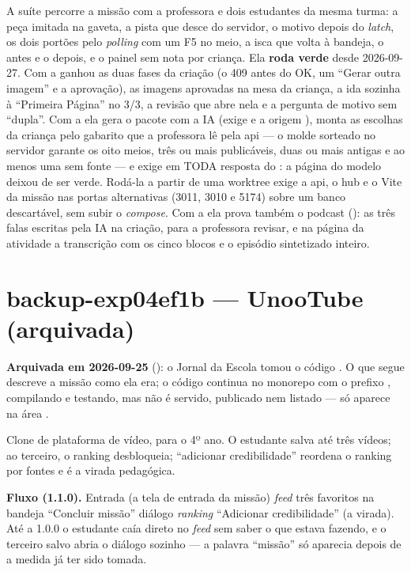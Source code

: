 A suíte  percorre a missão
com a professora e dois estudantes da mesma turma: a peça imitada na gaveta, a
pista que desce do servidor, o motivo depois do \emph{latch}, os dois portões
pelo \emph{polling} com um F5 no meio, a isca que volta à bandeja, o antes e o
depois, e o painel sem nota por criança. Ela \textbf{roda verde} desde
2026-09-27. Com a  ganhou as duas fases da criação (o 409
 antes do OK, um \enquote{Gerar outra imagem} e a
aprovação), as imagens aprovadas na mesa da criança, a ida sozinha à
\enquote{Primeira Página} no 3/3, a revisão que abre nela e a pergunta de
motivo sem \enquote{dupla}. Com a  ela gera o pacote com a IA
(exige  e a origem ), monta as escolhas da criança pelo
gabarito que a professora lê pela api --- o molde sorteado no servidor garante
os oito meios, três ou mais publicáveis, duas ou mais antigas e ao menos uma sem
fonte --- e exige  em TODA resposta do : a página do modelo deixou de ser verde. Rodá-la a partir de uma worktree exige a api, o hub e o Vite da
missão nas portas alternativas (3011, 3010 e 5174) sobre um banco descartável,
sem subir o \emph{compose}. Com a  ela prova também o podcast
(): as três falas escritas pela IA na
criação, para a professora revisar, e na página da atividade a transcrição com
os cinco blocos e o episódio sintetizado inteiro.

\section{backup-exp04ef1b --- UnooTube (arquivada)}

\textbf{Arquivada em 2026-09-25} (): o Jornal da Escola tomou o
código . O que segue descreve a missão como ela era; o código
continua no monorepo com o prefixo , compilando e testando, mas não
é servido, publicado nem listado --- só aparece na área .

Clone de plataforma de vídeo, para o 4º ano. O estudante salva até três vídeos; ao
terceiro, o ranking desbloqueia; \enquote{adicionar credibilidade} reordena o
ranking por fontes e é a virada pedagógica.

\textbf{Fluxo (1.1.0).} Entrada (a tela de entrada da missão) \seta{} \emph{feed}
\seta{} três favoritos na bandeja \seta{} \enquote{Concluir missão} \seta{}
diálogo \seta{} \emph{ranking} \seta{} \enquote{Adicionar credibilidade} (a
virada). Até a 1.0.0 o estudante caía direto no \emph{feed} sem saber o que estava
fazendo, e o terceiro salvo abria o diálogo sozinho --- a palavra
\enquote{missão} só aparecia depois de a medida já ter sido tomada.

